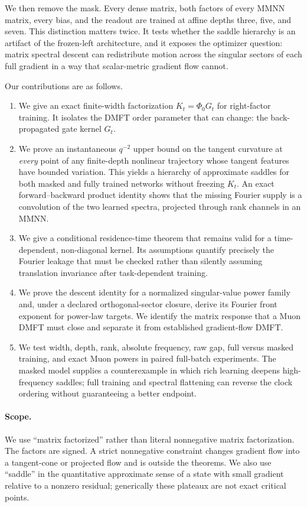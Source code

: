 \documentclass[11pt]{article}
\newcommand{\1}{\mathbf 1}
\theoremstyle{plain}
\theoremstyle{definition}
\begin{document}
We then remove the mask.  Every dense matrix, both factors of every MMNN
matrix, every bias, and the readout are trained at affine depths three, five,
and seven.  This distinction matters twice.  It tests whether the saddle
hierarchy is an artifact of the frozen-left architecture, and it exposes the
optimizer question: matrix spectral descent can redistribute motion across
the singular sectors of each full gradient in a way that scalar-metric
gradient flow cannot.

Our contributions are as follows.

\begin{enumerate}[leftmargin=2em]
\item We give an exact finite-width factorization
\(K_t=\Phi_0G_t\) for right-factor training.  It isolates the DMFT order
parameter that can change: the back-propagated gate kernel \(G_t\).
\item We prove an instantaneous \(q^{-2}\) upper bound on the tangent
curvature at \emph{every} point of any finite-depth nonlinear trajectory
whose tangent features have bounded variation.  This yields a hierarchy of
approximate saddles for both masked and fully trained networks without
freezing \(K_t\).  An exact forward--backward product identity shows that
the missing Fourier supply is a convolution of the two learned spectra,
projected through rank channels in an MMNN.
\item We give a conditional residence-time theorem that remains valid for a
time-dependent, non-diagonal kernel.  Its assumptions quantify precisely the
Fourier leakage that must be checked rather than silently assuming
translation invariance after task-dependent training.
\item We prove the descent identity for a normalized singular-value power
family and, under a declared orthogonal-sector closure, derive its Fourier
front exponent for power-law targets.  We identify the matrix response that
a Muon DMFT must close and separate it from established gradient-flow DMFT.
\item We test width, depth, rank, absolute frequency, raw gap, full versus
masked training, and exact Muon powers in paired full-batch experiments.  The
masked model supplies a counterexample in which rich learning deepens
high-frequency saddles; full training and spectral flattening can reverse
the clock ordering without guaranteeing a better endpoint.
\end{enumerate}

\paragraph{Scope.}
We use ``matrix factorized'' rather than literal nonnegative matrix
factorization.  The factors are signed.  A strict nonnegative constraint
changes gradient flow into a tangent-cone or projected flow and is outside
the theorems.  We also use ``saddle'' in the quantitative approximate sense
of a state with small gradient relative to a nonzero residual; generically
these plateaux are not exact critical points.
\end{document}
